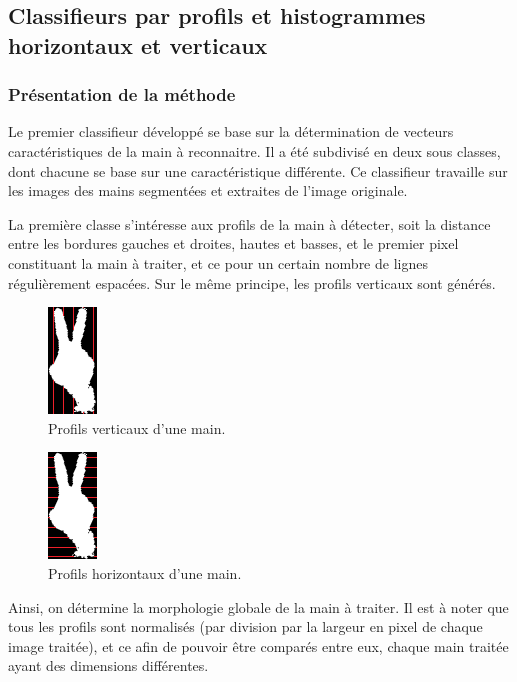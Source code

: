 \subsection{Classifieurs par profils et histogrammes horizontaux et verticaux}
\subsubsection{Présentation de la méthode}
Le premier classifieur développé se base sur la détermination de vecteurs caractéristiques de la main à reconnaitre. Il a été subdivisé en deux sous classes, dont chacune se base sur une caractéristique différente. Ce classifieur travaille sur les images des mains segmentées et extraites de l'image originale.

La première classe s'intéresse aux profils de la main à détecter, soit la distance entre les bordures gauches et droites, hautes et basses, et le premier pixel constituant la main à traiter, et ce pour un certain nombre de lignes régulièrement espacées. Sur le même principe, les profils verticaux sont générés.

\begin{figure}[htb!]
\centerline{\includegraphics{profilsVert.png}}
\caption{Profils verticaux d'une main.}
\end{figure}

\begin{figure}[htb!]
\centerline{\includegraphics{profilsHoriz.png}}
\caption{Profils horizontaux d'une main.}
\end{figure}

Ainsi, on détermine la morphologie globale de la main à traiter. Il est à noter que tous les profils sont normalisés (par division par la largeur en pixel de chaque image traitée), et ce afin de pouvoir être comparés entre eux, chaque main traitée ayant des dimensions différentes.

